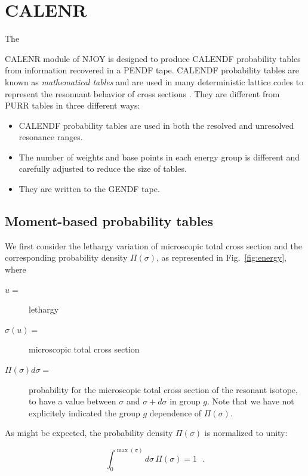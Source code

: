 \section{CALENR}
\label{sCALENR}

\hypertarget{sCALENRhy}{The}
CALENR module of NJOY is designed to produce
CALENDF probability tables from information recovered in a PENDF tape.
CALENDF probability tables are known as {\sl mathematical tables} and
are used in many deterministic lattice codes to represent the resonnant
behavior of cross sections \cite{ribon,calendf}. They are different from
PURR tables in three different ways:
\begin{itemize}
\item CALENDF probability tables are used in both the resolved and unresolved
resonance ranges.
\item The number of weights and base points in each energy group is different
and carefully adjusted to reduce the size of tables.
\item They are written to the GENDF tape.
\end{itemize}

\subsection{Moment-based probability tables}
\label{ssCALENR_Theory1}
We first consider the lethargy variation of microscopic total cross section
and the corresponding probability density $\Pi(\sigma)$, as
represented in Fig.~\ref{fig:energy}, where

\vskip -0.5cm

\begin{description}
\item [$u=$] lethargy
\item [$\sigma(u)=$] microscopic total cross section
\item [$\Pi(\sigma) d\sigma=$] probability for the microscopic total cross
section of the resonant isotope, to have a value between $\sigma$ and
$\sigma+d\sigma$ in group $g$. Note that we have not explicitely indicated
the group $g$ dependence of $\Pi(\sigma)$.
\end{description}

As might be expected, the probability density $\Pi(\sigma)$ is normalized to
unity:

\begin{equation}
\int_{0}^{\max(\sigma)} d\sigma \, \Pi(\sigma)=1 \ \ \ .
\label{eq:eq3}
\end{equation}

